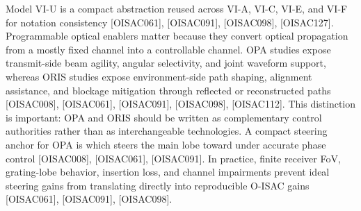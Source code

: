 {}\markdownRendererSoftLineBreak
{}\markdownRendererSoftLineBreak
{}\markdownRendererParagraphSeparator
{}Model VI-U is a compact abstraction reused across VI-A, VI-C, VI-E, and VI-F for notation consistency [O\markdownRendererUnderscore{}ISAC\markdownRendererUnderscore{}061], [O\markdownRendererUnderscore{}ISAC\markdownRendererUnderscore{}091], [O\markdownRendererUnderscore{}ISAC\markdownRendererUnderscore{}098], [O\markdownRendererUnderscore{}ISAC\markdownRendererUnderscore{}127].\markdownRendererBlockQuoteEnd \markdownRendererInterblockSeparator
{}\markdownRendererSectionBegin
{}\markdownRendererInterblockSeparator
{}Programmable optical enablers matter because they convert optical propagation from a mostly fixed channel into a controllable channel. OPA studies expose transmit-side beam agility, angular selectivity, and joint waveform support, whereas ORIS studies expose environment-side path shaping, alignment assistance, and blockage mitigation through reflected or reconstructed paths [O\markdownRendererUnderscore{}ISAC\markdownRendererUnderscore{}008], [O\markdownRendererUnderscore{}ISAC\markdownRendererUnderscore{}061], [O\markdownRendererUnderscore{}ISAC\markdownRendererUnderscore{}091], [O\markdownRendererUnderscore{}ISAC\markdownRendererUnderscore{}098], [O\markdownRendererUnderscore{}ISAC\markdownRendererUnderscore{}112]. This distinction is important: OPA and ORIS should be written as complementary control authorities rather than as interchangeable technologies.\markdownRendererParagraphSeparator
{}A compact steering anchor for OPA is\markdownRendererParagraphSeparator
{}\markdownRendererSoftLineBreak
{}\markdownRendererParagraphSeparator
{}which steers the main lobe toward  under accurate phase control [O\markdownRendererUnderscore{}ISAC\markdownRendererUnderscore{}008], [O\markdownRendererUnderscore{}ISAC\markdownRendererUnderscore{}061], [O\markdownRendererUnderscore{}ISAC\markdownRendererUnderscore{}091]. In practice, finite receiver FoV, grating-lobe behavior, insertion loss, and channel impairments prevent ideal steering gains from translating directly into reproducible O-ISAC gains [O\markdownRendererUnderscore{}ISAC\markdownRendererUnderscore{}061], [O\markdownRendererUnderscore{}ISAC\markdownRendererUnderscore{}091], [O\markdownRendererUnderscore{}ISAC\markdownRendererUnderscore{}098].\markdownRendererParagraphSeparator
